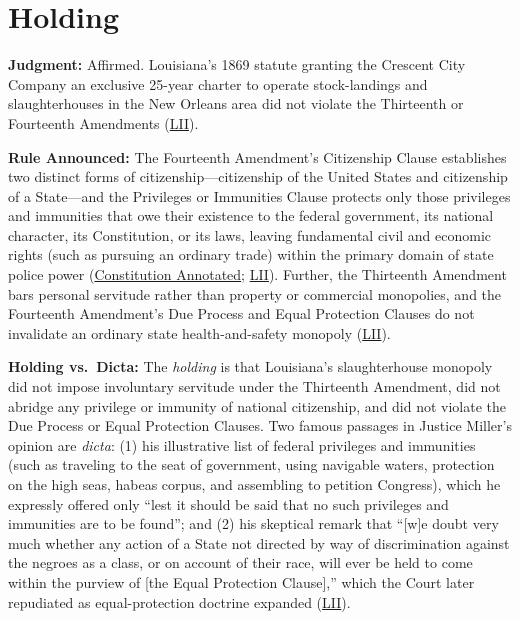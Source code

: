 \documentclass[12pt]{article}
\begin{document}
\section{Holding}

\textbf{Judgment:} Affirmed. Louisiana's 1869 statute granting the Crescent City Company an exclusive 25-year charter to operate stock-landings and slaughterhouses in the New Orleans area did not violate the Thirteenth or Fourteenth Amendments (\href{https://www.law.cornell.edu/supremecourt/text/83/36}{LII}).

\textbf{Rule Announced:} The Fourteenth Amendment's Citizenship Clause establishes two distinct forms of citizenship---citizenship of the United States and citizenship of a State---and the Privileges or Immunities Clause protects only those privileges and immunities that owe their existence to the federal government, its national character, its Constitution, or its laws, leaving fundamental civil and economic rights (such as pursuing an ordinary trade) within the primary domain of state police power (\href{https://www.law.cornell.edu/constitution-conan/amendment-14/section-1/slaughter-house}{Constitution Annotated}; \href{https://www.law.cornell.edu/supremecourt/text/83/36}{LII}). Further, the Thirteenth Amendment bars personal servitude rather than property or commercial monopolies, and the Fourteenth Amendment's Due Process and Equal Protection Clauses do not invalidate an ordinary state health-and-safety monopoly (\href{https://www.law.cornell.edu/supremecourt/text/83/36}{LII}).

\textbf{Holding vs.\ Dicta:} The \textit{holding} is that Louisiana's slaughterhouse monopoly did not impose involuntary servitude under the Thirteenth Amendment, did not abridge any privilege or immunity of national citizenship, and did not violate the Due Process or Equal Protection Clauses. Two famous passages in Justice Miller's opinion are \textit{dicta}: (1) his illustrative list of federal privileges and immunities (such as traveling to the seat of government, using navigable waters, protection on the high seas, habeas corpus, and assembling to petition Congress), which he expressly offered only ``lest it should be said that no such privileges and immunities are to be found''; and (2) his skeptical remark that ``[w]e doubt very much whether any action of a State not directed by way of discrimination against the negroes as a class, or on account of their race, will ever be held to come within the purview of [the Equal Protection Clause],'' which the Court later repudiated as equal-protection doctrine expanded (\href{https://www.law.cornell.edu/supremecourt/text/83/36}{LII}).
\end{document}
